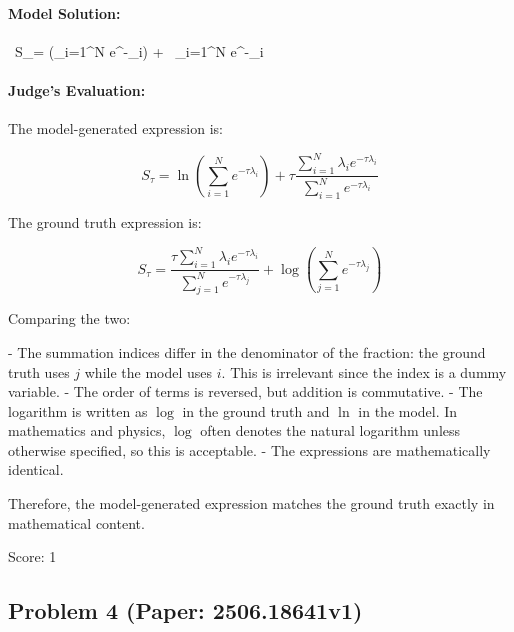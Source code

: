 \documentclass[10pt]{article}
\begin{document}
\paragraph*{Model Solution:}
\, S_{\tau}= \ln\!\Bigl(\sum_{i=1}^{N} e^{-\tau\lambda_i}\Bigr)
        + \tau\,
                         {\sum_{i=1}^{N} e^{-\tau\lambda_i}} \,

\paragraph*{Judge's Evaluation:}

The model-generated expression is:

\[
S_{\tau} = \ln\left(\sum_{i=1}^N e^{-\tau \lambda_i}\right) + \tau \frac{\sum_{i=1}^N \lambda_i e^{-\tau \lambda_i}}{\sum_{i=1}^N e^{-\tau \lambda_i}}
\]

The ground truth expression is:

\[
S_{\tau} = \frac{\tau \sum_{i=1}^N \lambda_i e^{-\tau \lambda_i}}{\sum_{j=1}^N e^{-\tau \lambda_j}} + \log \left( \sum_{j=1}^N e^{-\tau \lambda_j} \right)
\]

Comparing the two:

- The summation indices differ in the denominator of the fraction: the ground truth uses \(j\) while the model uses \(i\). This is irrelevant since the index is a dummy variable.
- The order of terms is reversed, but addition is commutative.
- The logarithm is written as \(\log\) in the ground truth and \(\ln\) in the model. In mathematics and physics, \(\log\) often denotes the natural logarithm unless otherwise specified, so this is acceptable.
- The expressions are mathematically identical.

Therefore, the model-generated expression matches the ground truth exactly in mathematical content.

Score: 1

\newpage
\subsection*{Problem 4 (Paper: 2506.18641v1)}
\end{document}
